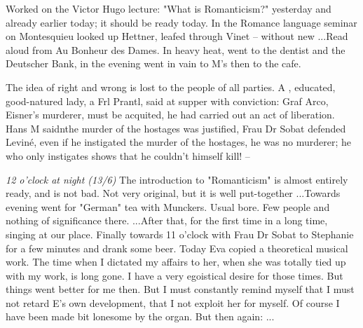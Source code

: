
Worked on the Victor Hugo lecture: "What is Romanticism?" yesterday and already earlier today; it should be ready today. In the Romance language seminar on Montesquieu looked up Hettner, leafed through Vinet -- without new ...Read aloud from Au Bonheur des Dames. In heavy heat, went to the dentist and the Deutscher Bank, in the evening went in vain to M's then to the cafe.

The idea of right and wrong is lost to the people of all parties. A , educated, good-natured lady, a Frl Prantl, said at supper with conviction: Graf Arco, Eisner's murderer, must be acquited, he had carried out an act of liberation. Hans M saidnthe murder of the hostages was justified, Frau Dr Sobat defended 
Leviné, even if he instigated the murder of the hostages, he was no murderer; he who only instigates shows that he couldn't himself kill! --

\missing

\textit{12 o'clock at night (13/6)} The introduction to "Romanticism" is almost entirely ready, and is not bad. Not very original, but it is well put-together ...Towards evening went for "German" tea with Munckers. Usual bore. Few people and nothing of significance there. ...After that, for the first time in a long time, singing at our place. Finally towards 11 o'clock with Frau Dr Sobat to Stephanie for a few minutes and drank some beer. Today Eva copied a theoretical musical work. The time when I dictated my affairs to her, when she was totally tied up with my work, is long gone. I have a very egoistical desire for those times. But things went better for me then. But I must constantly remind myself that I must not retard E's own development, that I not exploit her for myself. Of course I have been made bit lonesome by the organ. But then again: ...